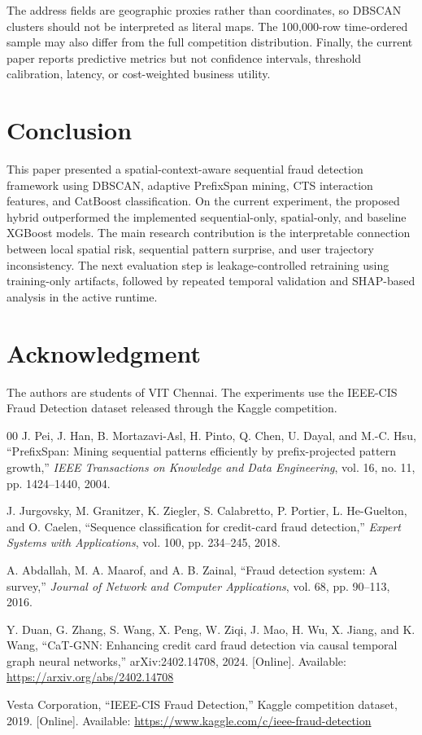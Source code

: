 \documentclass[conference]{IEEEtran}
\begin{document}
The address fields are geographic proxies rather than coordinates, so DBSCAN clusters should not be interpreted as literal maps. The 100,000-row time-ordered sample may also differ from the full competition distribution. Finally, the current paper reports predictive metrics but not confidence intervals, threshold calibration, latency, or cost-weighted business utility.

\section{Conclusion}
This paper presented a spatial-context-aware sequential fraud detection framework using DBSCAN, adaptive PrefixSpan mining, CTS interaction features, and CatBoost classification. On the current experiment, the proposed hybrid outperformed the implemented sequential-only, spatial-only, and baseline XGBoost models. The main research contribution is the interpretable connection between local spatial risk, sequential pattern surprise, and user trajectory inconsistency. The next evaluation step is leakage-controlled retraining using training-only artifacts, followed by repeated temporal validation and SHAP-based analysis in the active runtime.

\section*{Acknowledgment}
The authors are students of VIT Chennai. The experiments use the IEEE-CIS Fraud Detection dataset released through the Kaggle competition.

\balance
\begin{thebibliography}{00}
 J. Pei, J. Han, B. Mortazavi-Asl, H. Pinto, Q. Chen, U. Dayal, and M.-C. Hsu, ``PrefixSpan: Mining sequential patterns efficiently by prefix-projected pattern growth,'' \textit{IEEE Transactions on Knowledge and Data Engineering}, vol. 16, no. 11, pp. 1424--1440, 2004.

 J. Jurgovsky, M. Granitzer, K. Ziegler, S. Calabretto, P. Portier, L. He-Guelton, and O. Caelen, ``Sequence classification for credit-card fraud detection,'' \textit{Expert Systems with Applications}, vol. 100, pp. 234--245, 2018.

 A. Abdallah, M. A. Maarof, and A. B. Zainal, ``Fraud detection system: A survey,'' \textit{Journal of Network and Computer Applications}, vol. 68, pp. 90--113, 2016.

 Y. Duan, G. Zhang, S. Wang, X. Peng, W. Ziqi, J. Mao, H. Wu, X. Jiang, and K. Wang, ``CaT-GNN: Enhancing credit card fraud detection via causal temporal graph neural networks,'' arXiv:2402.14708, 2024. [Online]. Available: \url{https://arxiv.org/abs/2402.14708}

 Vesta Corporation, ``IEEE-CIS Fraud Detection,'' Kaggle competition dataset, 2019. [Online]. Available: \url{https://www.kaggle.com/c/ieee-fraud-detection}
\end{thebibliography}
\end{document}
